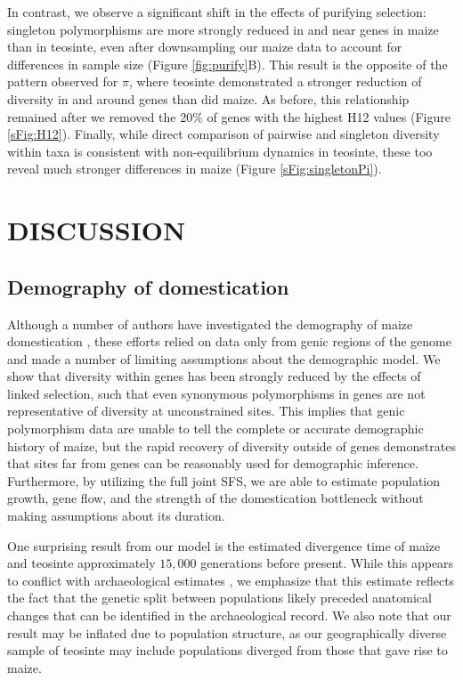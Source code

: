 \documentclass[12pt,a4paper]{article}
\begin{document}
In contrast, we observe a significant shift in the effects of purifying selection: singleton polymorphisms are more strongly reduced in and near genes in maize than in teosinte, even after downsampling our maize data to account for differences in sample size (Figure \ref{fig:purify}B). 
This result is the opposite of the pattern observed for $\pi$, where teosinte demonstrated a stronger reduction of diversity in and around genes than did maize. 
As before, this relationship remained after we removed the 20\% of genes with the highest H12 values (Figure \ref{sFig:H12}).
Finally, while direct comparison of pairwise and singleton diversity within taxa is consistent with   non-equilibrium dynamics in teosinte, these too reveal much stronger differences in maize (Figure \ref{sFig:singletonPi}).

\section*{DISCUSSION}


\subsection*{Demography of domestication} %
Although a number of authors have investigated the demography of maize domestication \cite{eyre1998, tenaillon2004, wright2005}, these  efforts relied on data only from genic regions of the genome and made a number of limiting assumptions about the demographic model.  We show that diversity within genes has been strongly reduced by the effects of linked selection, such that even synonymous polymorphisms in genes are not representative of diversity at unconstrained sites. This implies that genic polymorphism data are unable to tell the complete or accurate demographic history of maize, but the rapid recovery of diversity outside of genes demonstrates that sites far from genes can be reasonably used for demographic inference. Furthermore, by utilizing the full joint SFS, we are able to estimate population growth, gene flow, and the strength of the domestication bottleneck without making assumptions about its duration.  

One surprising result from our model is the estimated divergence time of maize and teosinte approximately $15,000$ generations before present.
While this appears to conflict with archaeological estimates \cite{piperno2009}, we emphasize that this estimate reflects the fact that the genetic split between populations likely preceded anatomical changes that can be identified in the archaeological record. 
We also note that our result may be inflated due to population structure, as our geographically diverse sample of teosinte may include populations diverged from those that gave rise to maize.
\end{document}

